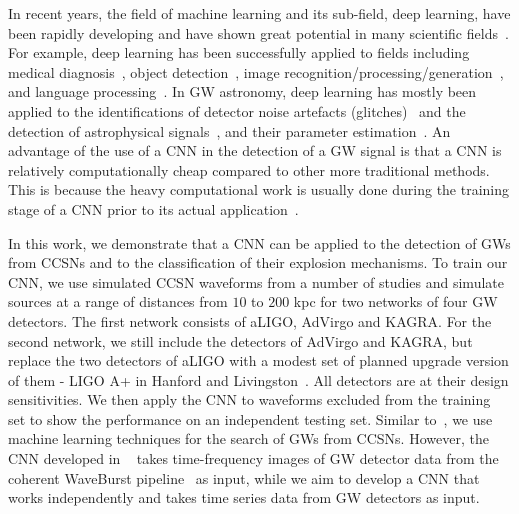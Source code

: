 \documentclass[aps,twocolumn,showpacs,groupedaddress, nofootinbib]{revtex4}  %
\begin{document}
%
% 
In recent years, the field of machine learning and its sub-field, deep
learning, have been rapidly developing and have shown great potential in many
scientific fields~\cite{krizhevsky2012imagenet, NIPS2014_5423,
simonyan2014very, chen2014semantic, zeiler2014visualizing, szegedy2015going}.
For example, deep learning has been successfully applied to fields including
medical diagnosis~\cite{kononenko2001machine}, object
detection~\cite{redmon2016you}, image
recognition/processing/generation~\cite{he2016deep, krizhevsky2012imagenet,
zhang2016colorful, karpathy2015deep}, and  language
processing~\cite{lample2016neural}. In \ac{GW} astronomy, deep learning has
mostly been applied to the identifications of detector noise artefacts
(glitches)~\cite{mukund2017transient, zevin2017gravity, george2017deep} and the
detection of astrophysical signals~\cite{george2018deep, gabbard2018matching, astone2018new},
and their parameter estimation~\cite{2019arXiv190906296G}.
An advantage of the use of a \ac{CNN} in the detection
of a \ac{GW} signal is that a \ac{CNN} is relatively computationally cheap
compared to other more traditional methods. This is because the heavy
computational work is usually done during the training stage of a \ac{CNN}
prior to its actual application~\cite{goodfellow2016deep}.

%
%
In this work, we demonstrate that a \ac{CNN} can be applied to the detection of
\acp{GW} from \acp{CCSN} and to the classification of their explosion
mechanisms. 
To train our \ac{CNN}, we use simulated \ac{CCSN} waveforms from a
number of studies and simulate sources at a range of distances from $10$ to
$200$ kpc for two networks of four \ac{GW} detectors. The first network
consists of \ac{aLIGO}, \ac{AdVirgo} and KAGRA. For the second network, we
still include the detectors of \ac{AdVirgo} and KAGRA, but replace the two
detectors of \ac{aLIGO} with a modest set of planned upgrade version of them -
LIGO A+ in Hanford and Livingston~\cite{miller2015prospects, LIGOW}. All detectors 
are at their design sensitivities. We then
apply the \ac{CNN} to waveforms excluded from the training set to show 
the performance on an independent testing set.
Similar to~\cite{astone2018new}, 
we use machine learning techniques for the search of \acp{GW} from \acp{CCSN}.
However, the \ac{CNN} developed in ~\cite{astone2018new} takes time-frequency images of \ac{GW} detector 
data from the coherent WaveBurst pipeline~\cite{klimenko2005constraint} as input, 
while we aim to develop a \ac{CNN} that works independently and takes time series data from \ac{GW} detectors as input.
\end{document}

